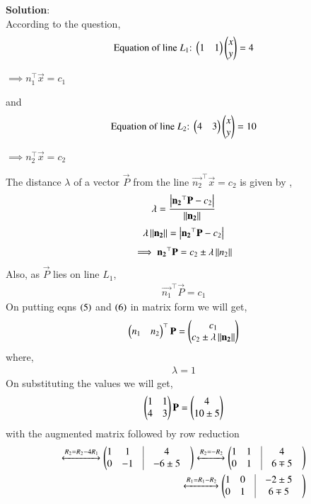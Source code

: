 \documentclass[journal]{IEEEtran}
\begin{document}
\textbf{Solution}:\\
According to the question,\\
\begin{align}
    \text{Equation of line $L_1$:}\ \begin{pmatrix}1&1\end{pmatrix}\begin{pmatrix}x\\y\end{pmatrix}=4
\end{align}
\begin{center}
    $\implies n_1^{\top} \vec{x} = c_1$
\end{center}
and
\begin{align}
    \text{Equation of line $L_2$:}\ \begin{pmatrix}4&3\end{pmatrix}\begin{pmatrix}x\\y\end{pmatrix}=10
\end{align}
\begin{center}
    $\implies n_2^{\top} \vec{x} = c_2$
\end{center}
The distance $\lambda$ of a vector $\vec{P}$ from the line $\vec{n_2}^{\top}\vec{x}=c_2$ is given by ,
\begin{align}
    \lambda = \frac{\left\vert\mathbf{n_2}^{\top}\mathbf{P} - c_2\right\vert}{\left\lVert\mathbf{n_2}\right\rVert}  
\end{align}
\begin{align}
    \lambda\left\lVert\mathbf{n_2}\right\rVert = \left\vert\mathbf{n_2}^{\top}\mathbf{P} - c_2\right\vert 
\end{align}
\begin{align}
    \implies\mathbf{n_2}^{\top}\mathbf{P} = c_2 \pm \lambda\left\lVert n_2\right\rVert
\end{align}
Also, as $\vec{P}$ lies on line $L_1$,
\begin{align}
    \vec{n_1}^{\top}\vec{P} = c_1
\end{align}
On putting eqns $\left(5\right)$ and $\left(6\right)$ in matrix form we will get,
\begin{align}
    \begin{pmatrix}n_1 & n_2\end{pmatrix}^\top\mathbf{P}=\begin{pmatrix}c_1\\c_2\pm\lambda\left\lVert\mathbf{n_2}\right\rVert\end{pmatrix}
\end{align}
where,
\begin{align*}
    \lambda = 1
\end{align*}
On substituting the values we will get,
\begin{align}
    \begin{pmatrix}1&1\\4&3\end{pmatrix}\mathbf{P}=\begin{pmatrix}4\\10\pm5\end{pmatrix}
\end{align}
with the augmented matrix followed by row reduction 
\begin{align}
	\xleftrightarrow{R_2 = R_2 - 4 R_1}\myvec{1&1 &\vrule &  4&\\ 0&-1 & \vrule& -6\pm5&}   
	\xleftrightarrow{R_2 = -R_2}\myvec{1&1&\vrule& 4& \\ 0&1 & \vrule &6\mp5} \nonumber \\
	\xleftrightarrow{R_1 = R_1-R_2}\myvec{1&0 & \vrule &-2\pm5&\\ 0&1& \vrule &6\mp5}\nonumber
\end{align}
\end{document}
